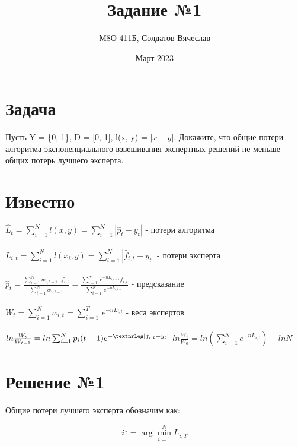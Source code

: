 \documentclass{article}
\title{Задание №1}
\author{М8О-411Б, Солдатов Вячеслав}
\date{Март 2023}
\newcommand{\mathnrleg}{\textnormal{\textnrleg}}
\begin{document}
\maketitle

\section{Задача}
Пусть Y = \{0, 1\}, D = [0, 1], l(x, y) = $|x - y|$. Докажите, что общие потери алгоритма экспоненциального взвешивания экспертных решений не меньше общих потерь
лучшего эксперта.

\section{Известно}
{\Large
\noindent $\hat{L}_t = \sum_{i=1}^N l(x,y) = \sum_{i=1}^N |\hat{p}_t - y_t|$ - потери алгоритма \\\\
$L_{i,t} = \sum_{i=1}^N l(x_i,y) = \sum_{i=1}^N |\hat{f}_{i,t} - y_t|$ - потери эксперта \\\\
$\hat{p}_t = \frac{\sum_{i=1}^N w_{i,t-1} \cdot f_{i,t}}{\sum_{i=1}^N w_{i,t-1}} = \frac{\sum_{i=1}^{N}\, e^{-nL_{i,t-1}}f_{i,t}}{\sum_{i=1}^{N}\, e^{-nL_{i,t-1}}}$ - предсказание \\\\
$W_t = \sum_{i=1}^N w_{i,t} = \sum_{i=1}^{T}\, e^{-nL_{i,t}}$ - веса экспертов \\\\
$ln\frac{W_t}{W_{t-1}} = ln\sum_{i=1}^N p_i(t-1)e^{-\mathnrleg|f_{i,t}-y_t|} \\\\$
$ln\frac{W_t}{W_{0}} = ln(\sum_{i=1}^N e^{-nL_{i,t}})-lnN$
}

\section{Решение №1}

Общие потери лучшего эксперта обозначим как:

$$i^\star = \arg\min_{i=1}^N L_{i,T}$$
\end{document}
